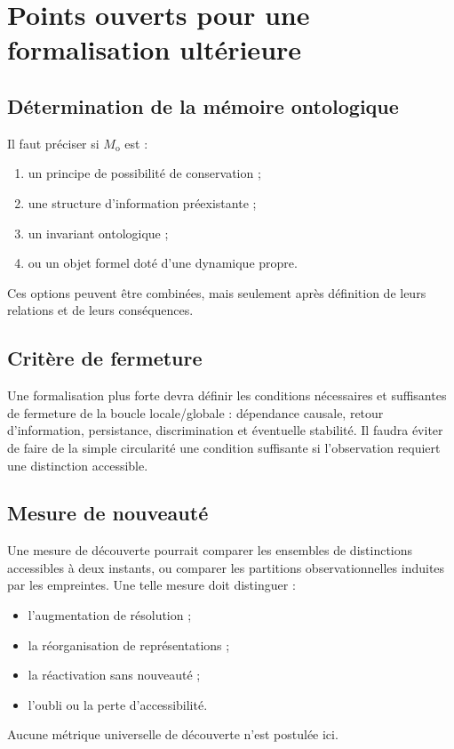 \documentclass[11pt,a4paper,openany]{book}
\newcommand{\Monto}{M_{\mathrm{o}}}
\begin{document}
\chapter{Points ouverts pour une formalisation ultérieure}

\section{Détermination de la mémoire ontologique}
Il faut préciser si $\Monto$ est :
\begin{enumerate}
\item un principe de possibilité de conservation ;
\item une structure d'information préexistante ;
\item un invariant ontologique ;
\item ou un objet formel doté d'une dynamique propre.
\end{enumerate}
Ces options peuvent être combinées, mais seulement après définition de leurs relations et de leurs conséquences.

\section{Critère de fermeture}
Une formalisation plus forte devra définir les conditions nécessaires et suffisantes de fermeture de la boucle locale/globale : dépendance causale, retour d'information, persistance, discrimination et éventuelle stabilité. Il faudra éviter de faire de la simple circularité une condition suffisante si l'observation requiert une distinction accessible.

\section{Mesure de nouveauté}
Une mesure de découverte pourrait comparer les ensembles de distinctions accessibles à deux instants, ou comparer les partitions observationnelles induites par les empreintes. Une telle mesure doit distinguer :
\begin{itemize}
\item l'augmentation de résolution ;
\item la réorganisation de représentations ;
\item la réactivation sans nouveauté ;
\item l'oubli ou la perte d'accessibilité.
\end{itemize}
Aucune métrique universelle de découverte n'est postulée ici.
\end{document}

